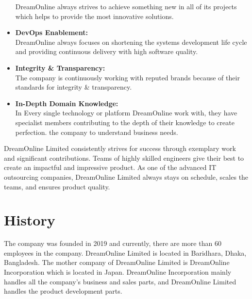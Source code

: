\begin{flushleft}
\begin{itemize}
     \vspace{6pt}
DreamOnline always strives to achieve something new in all of its projects which helps
to provide the most innovative solutions.
    \item  \textbf{DevOps Enablement:}\\
     \vspace{6pt}
DreamOnline always focuses on shortening the systems development life cycle and
providing continuous delivery with high software quality.
    \item \textbf{Integrity \& Transparency:}\\
     \vspace{6pt}
The company is continuously working with reputed brands because of their standards for
integrity & transparency.
    \item \textbf{In-Depth Domain Knowledge:}\\
     \vspace{6pt}
In Every single technology or platform DreamOnline work with, they have specialist
members contributing to the depth of their knowledge to create perfection.
the company to understand business needs.
\end{itemize}


DreamOnline Limited consistently strives for success through exemplary work and significant
contributions. Teams of highly skilled engineers give their best to create an impactful and
impressive product. As one of the advanced IT outsourcing companies, DreamOnline Limited
always stays on schedule, scales the teams, and ensures product quality.

\end{flushleft}

\section{History}
\begin{flushleft}
    The company was founded in 2019 and currently, there are more than 60 employees in the
company. DreamOnline Limited is located in Baridhara, Dhaka, Bangladesh. The mother
company of DreamOnline Limited is DreamOnline Incorporation which is located in Japan.
DreamOnline Incorporation mainly handles all the company's business and sales parts, and
DreamOnline Limited handles the product development parts.

\end{flushleft}

